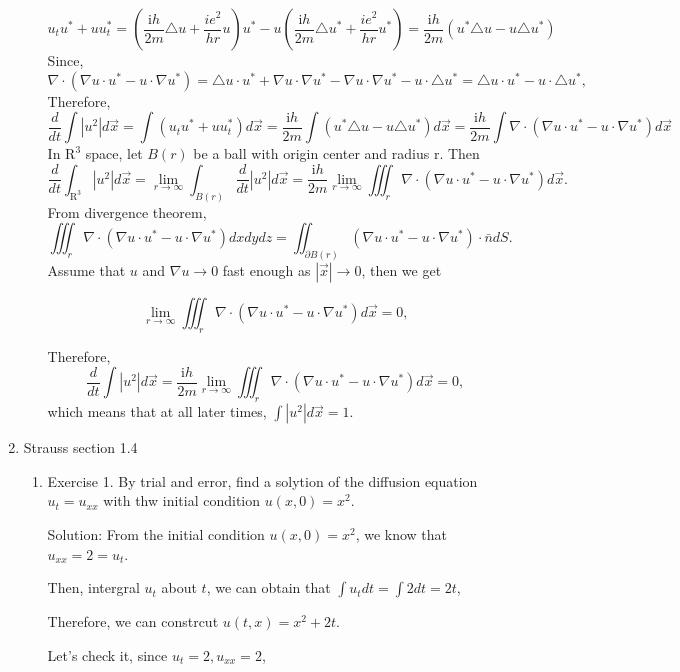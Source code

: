 \documentclass{article}
\begin{document}
\begin{enumerate}
\begin{enumerate}
			\[u_{t}u^*+uu_{t}^*=(\frac{\mathrm{i}h}{2m}\triangle u+\frac{ie^2}{hr}u)u^*-u(\frac{\mathrm{i}h}{2m}\triangle u^*+\frac{ie^2}{hr}u^*)= \frac{\mathrm{i}h}{2m} (u^*\triangle u -u\triangle u^*) \]
			Since, \[\nabla \cdot (\nabla u \cdot u^* -u\cdot \nabla u^*)= \triangle u \cdot u^*+ \nabla u\cdot \nabla u^*- \nabla u\cdot \nabla u^*- u\cdot\triangle u^*=\triangle u \cdot u^*-u\cdot\triangle u^*,\]
			Therefore, \[ \frac{d}{dt}\int \left | u^2 \right | d \vec{x }=\int(u_{t}u^*+uu_{t}^*)  d \vec{x } = \frac{\mathrm{i}h}{2m}\int(u^*\triangle u -u\triangle u^*)d \vec{x }=\frac{\mathrm{i}h}{2m}\int \nabla \cdot (\nabla u \cdot u^* -u\cdot \nabla u^*)d \vec{x }\]
            In $\mathrm{R}^3$ space, let $B(r)$ be a ball with origin center and radius r.
			Then \[ \frac{d}{dt}\int_{\mathrm{R^3} }^{}  \left | u^2 \right | d \vec{x }= \lim_{r \to \infty}\int_{B(r)}\frac{d}{dt} \left | u^2 \right | d \vec{x }= \frac{\mathrm{i}h}{2m}\lim_{r \to \infty}\iiint_{r}^{} \nabla \cdot (\nabla u \cdot u^* -u\cdot \nabla u^*)d \vec{x }.\]
			From divergence theorem,
			\[\iiint_{r}^{} \nabla \cdot (\nabla u \cdot u^* -u\cdot \nabla u^*)dx dy dz= \iint_{\partial B(r)}^{}(\nabla u \cdot u^* -u\cdot \nabla u^*) \cdot \bar{n} dS.	\]
			Assume that $u$ and $\nabla u \to 0$ fast enough as $\left | \vec{x} \right | \to 0$, then we get
		
		\[ \lim_{r \to \infty}\iiint_{r}^{} \nabla \cdot (\nabla u \cdot u^* -u\cdot \nabla u^*)d \vec{x } =0,\]

		Therefore, \[ \frac{d}{dt}\int \left | u^2 \right | d \vec{x }=\frac{\mathrm{i}h}{2m}\lim_{r \to \infty}\iiint_{r}^{} \nabla \cdot (\nabla u \cdot u^* -u\cdot \nabla u^*)d \vec{x }=0,\]
			which means that at all later times, $ \int \left | u^2 \right | d \vec{x } =1$.
		
	\end{enumerate}
\item Strauss section 1.4
	\begin{enumerate}
		\item Exercise 1. By trial and error, find a solytion of the diffusion equation $u_t=u_{xx}$ with thw initial condition $u(x,0)=x^2.$
		
		Solution: From the initial condition $u(x,0)=x^2$, we know that $u_{xx}=2=u_t$. 
		
		Then, intergral $u_{t}$ about $t$, we can obtain that $\int u_{t} dt= \int 2 dt = 2t$,

		Therefore, we can constrcut $u(t,x)=x^2+2t$.

		Let's check it, since $u_{t}=2, u_{xx}=2$,


\end{enumerate}
\end{enumerate}
\end{document}
